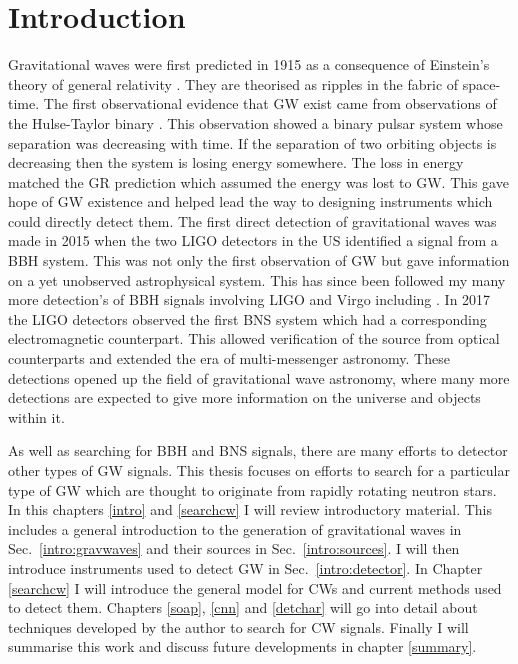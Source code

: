 \chapter{\label{intro}Introduction}


Gravitational waves were first predicted in 1915 as a consequence of Einstein's theory of general relativity \citep{einstein2005GrundlageAllgemeinen}.
They are theorised as ripples in the fabric of space-time.
The first observational evidence that \ac{GW} exist came from observations of the Hulse-Taylor binary \citep{weisberg1981GravitationalWaves,weisberg2004RelativisticBinary}. 
This observation showed a binary pulsar system whose separation was decreasing with time. 
If the separation of two orbiting objects is decreasing then the system is losing energy somewhere.
The loss in energy matched the \ac{GR} prediction which assumed the energy was lost to \ac{GW}.
This gave hope of \ac{GW} existence and helped lead the way to designing instruments which could directly detect them.
The first direct detection of gravitational waves was made in 2015 when the two \ac{LIGO} detectors in the US \citep{abbott2016ObservationGravitational} identified a signal from a \ac{BBH} system.
This was not only the first observation of \ac{GW} but gave information on a yet unobserved astrophysical system.
This has since been followed my many more detection's of \ac{BBH} signals involving \ac{LIGO} and Virgo including \citep{abbott2017GW170814ThreeDetector,theligoscientificcollaboration2020GW190425Observation}.
In 2017 the \ac{LIGO} detectors observed the first \ac{BNS} system \citep{abbott2017GW170817Observation} which had a corresponding electromagnetic counterpart.
This allowed verification of the source from optical counterparts and extended the era of multi-messenger astronomy.
These detections opened up the field of gravitational wave astronomy, where many more detections are expected to give more information on the universe and objects within it.

As well as searching for \ac{BBH} and \ac{BNS} signals, there are many efforts to detector other types of \ac{GW} signals. 
This thesis focuses on efforts to search for a particular type of \ac{GW} which are thought to originate from rapidly rotating neutron stars.
In this chapters \ref{intro} and \ref{searchcw} I will review introductory material. 
This includes a general introduction to the generation of gravitational waves in Sec.~\ref{intro:gravwaves} and their sources in Sec.~\ref{intro:sources}.
I will then introduce instruments used to detect \ac{GW} in Sec.~\ref{intro:detector}.
In Chapter \ref{searchcw} I will introduce the general model for \acp{CW} and current methods used to detect them.
Chapters \ref{soap}, \ref{cnn} and \ref{detchar} will go into detail about techniques developed by the author to search for \ac{CW} signals. 
Finally I will summarise this work and discuss future developments in chapter \ref{summary}.


